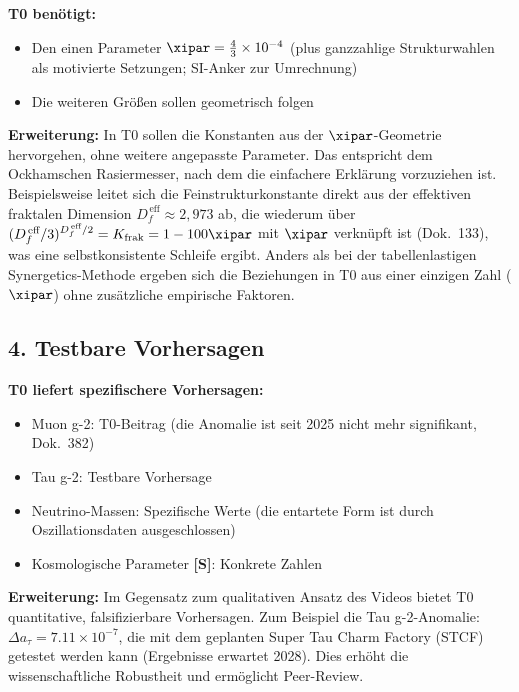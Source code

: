 	\textbf{T0 benötigt:}
	\begin{itemize}
		\item Den einen Parameter $\xipar = \frac{4}{3} \times 10^{-4}$ (plus ganzzahlige Strukturwahlen als motivierte Setzungen; SI-Anker zur Umrechnung)
		\item Die weiteren Größen sollen geometrisch folgen
	\end{itemize}
	
	\textbf{Erweiterung:} In T0 sollen die Konstanten aus der $\xipar$-Geometrie hervorgehen, ohne weitere angepasste Parameter. Das entspricht dem Ockhamschen Rasiermesser, nach dem die einfachere Erklärung vorzuziehen ist. Beispielsweise leitet sich die Feinstrukturkonstante direkt aus der effektiven fraktalen Dimension $D_f^{\,\text{eff}} \approx 2{,}973$ ab, die wiederum über $(D_f^{\,\text{eff}}/3)^{D_f^{\,\text{eff}}/2} = K_{\text{frak}} = 1 - 100\xipar$ mit $\xipar$ verknüpft ist (Dok.~133), was eine selbstkonsistente Schleife ergibt. Anders als bei der tabellenlastigen Synergetics-Methode ergeben sich die Beziehungen in T0 aus einer einzigen Zahl ($\xipar$) ohne zusätzliche empirische Faktoren.
	
	\subsection{4. Testbare Vorhersagen}
	
	\begin{vorteil}
		\textbf{T0 liefert spezifischere Vorhersagen:}
		\begin{itemize}
			\item Muon g-2: T0-Beitrag (die Anomalie ist seit 2025 nicht mehr signifikant, Dok.~382)
			\item Tau g-2: Testbare Vorhersage
			\item Neutrino-Massen: Spezifische Werte (die entartete Form ist durch Oszillationsdaten ausgeschlossen)
			\item Kosmologische Parameter \textbf{[S]}: Konkrete Zahlen
		\end{itemize}
		
		\textbf{Erweiterung:} Im Gegensatz zum qualitativen Ansatz des Videos bietet T0 quantitative, falsifizierbare Vorhersagen. Zum Beispiel die Tau g-2-Anomalie: $\Delta a_\tau = 7.11 \times 10^{-7}$, die mit dem geplanten Super Tau Charm Factory (STCF) getestet werden kann (Ergebnisse erwartet 2028). Dies erhöht die wissenschaftliche Robustheit und ermöglicht Peer-Review.
	\end{vorteil}
	
